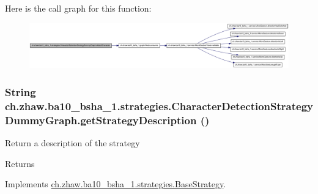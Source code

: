 Here is the call graph for this function:\nopagebreak
\begin{figure}[H]
\begin{center}
\leavevmode
\includegraphics[width=420pt]{classch_1_1zhaw_1_1ba10__bsha__1_1_1strategies_1_1CharacterDetectionStrategyDummyGraph_a6538ab532757576966ecf883ab771e32_cgraph}
\end{center}
\end{figure}
\hypertarget{classch_1_1zhaw_1_1ba10__bsha__1_1_1strategies_1_1CharacterDetectionStrategyDummyGraph_a5cb3260ddc362ed0979fa45d927c5be0}{
\subsubsection[{getStrategyDescription}]{\setlength{\rightskip}{0pt plus 5cm}String ch.zhaw.ba10\_\-bsha\_\-1.strategies.CharacterDetectionStrategyDummyGraph.getStrategyDescription ()}}
\label{classch_1_1zhaw_1_1ba10__bsha__1_1_1strategies_1_1CharacterDetectionStrategyDummyGraph_a5cb3260ddc362ed0979fa45d927c5be0}
Return a description of the strategy

\begin{DoxyReturn}{Returns}

\end{DoxyReturn}


Implements \hyperlink{classch_1_1zhaw_1_1ba10__bsha__1_1_1strategies_1_1BaseStrategy_a75fdb36932ad701f6375cc1fe718056b}{ch.zhaw.ba10\_\-bsha\_\-1.strategies.BaseStrategy}.


